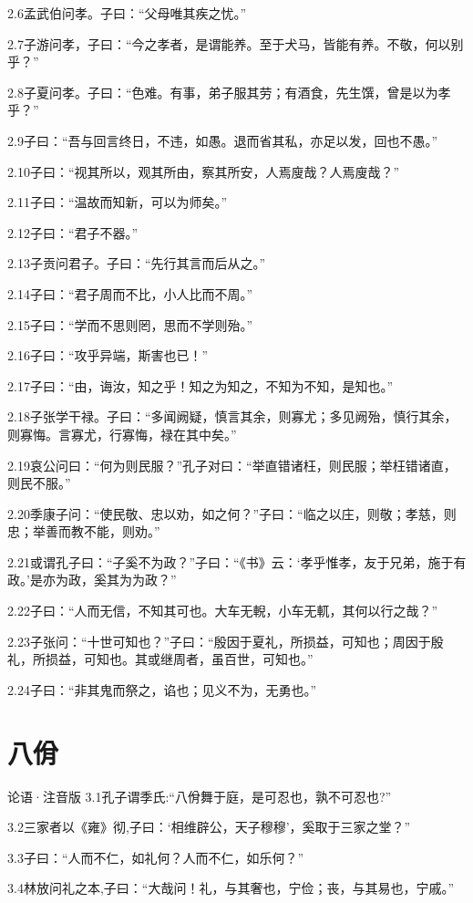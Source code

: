 \documentclass[a4paper,12pt,UTF8,twoside]{ctexbook}
\begin{document}
2.6孟武伯问孝。子曰：“父母唯其疾之忧。”

2.7子游问孝，子曰：“今之孝者，是谓能养。至于犬马，皆能有养。不敬，何以别乎？”


2.8子夏问孝。子曰：“色难。有事，弟子服其劳；有酒食，先生馔，曾是以为孝乎？”

2.9子曰：“吾与回言终日，不违，如愚。退而省其私，亦足以发，回也不愚。”

2.10子曰：“视其所以，观其所由，察其所安，人焉廋哉？人焉廋哉？”

2.11子曰：“温故而知新，可以为师矣。”

2.12子曰：“君子不器。”

2.13子贡问君子。子曰：“先行其言而后从之。”

2.14子曰：“君子周而不比，小人比而不周。”

2.15子曰：“学而不思则罔，思而不学则殆。”

2.16子曰：“攻乎异端，斯害也已！”

2.17子曰：“由，诲汝，知之乎！知之为知之，不知为不知，是知也。”

2.18子张学干禄。子曰：“多闻阙疑，慎言其余，则寡尤；多见阙殆，慎行其余，则寡悔。言寡尤，行寡悔，禄在其中矣。”

2.19哀公问曰：“何为则民服？”孔子对曰：“举直错诸枉，则民服；举枉错诸直，则民不服。”

2.20季康子问：“使民敬、忠以劝，如之何？”子曰：“临之以庄，则敬；孝慈，则忠；举善而教不能，则劝。”

2.21或谓孔子曰：“子奚不为政？”子曰：“《书》云：‘孝乎惟孝，友于兄弟，施于有政。’是亦为政，奚其为为政？”

2.22子曰：“人而无信，不知其可也。大车无輗，小车无軏，其何以行之哉？”

2.23子张问：“十世可知也？”子曰：“殷因于夏礼，所损益，可知也；周因于殷礼，所损益，可知也。其或继周者，虽百世，可知也。”

2.24子曰：“非其鬼而祭之，谄也；见义不为，无勇也。”

\chapter{八佾}
论语·注音版
3.1孔子谓季氏:“八佾舞于庭，是可忍也，孰不可忍也?”

3.2三家者以《雍》彻,子曰：‘相维辟公，天子穆穆’，奚取于三家之堂？”

3.3子曰：“人而不仁，如礼何？人而不仁，如乐何？”

3.4林放问礼之本,子曰：“大哉问！礼，与其奢也，宁俭；丧，与其易也，宁戚。”
\end{document}
